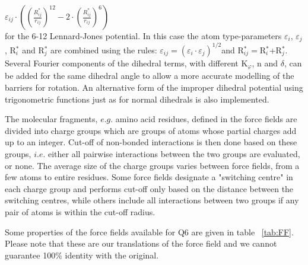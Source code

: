 \documentclass[a4paper,11pt]{article}
\let\origref\ref
\def\ref#1{\unskip~\origref{#1}}
\begin{document}
$\varepsilon_{ij} \cdot \left( {\left( {\frac{R_{ij}^\ast
}{r_{ij}}} \right)^{12}-2\cdot \left( {\frac{R_{ij}^\ast
}{r_{ij}}} \right)^6} \right)$\\

for the 6-12 Lennard-Jones potential. In this case the atom
type-parameters $\varepsilon _{i}$, $\varepsilon _{j}$,
R$^{\ast}_{i}$ and R$^{\ast }_{j}$ are combined using the rules:
$\varepsilon _{ij}=(\varepsilon _{i}\cdot \varepsilon
_{j})^{1/2}$and R$^{\ast}_{ij} = $R$^{\ast}_{i}$+R$^{\ast}_{j}$.
Several Fourier components of the dihedral terms, with different
K$_{\varphi }$, n and $\delta $, can be added for the same
dihedral angle to allow a more accurate modelling of the barriers
for rotation. An alternative form of the improper dihedral
potential using trigonometric functions just as for normal
dihedrals is also implemented.

The molecular  fragments, $e.g.$ amino  acid residues, defined  in the
force fields are divided into charge  groups which are groups of atoms
whose  partial charges  add up  to an  integer. Cut-off  of non-bonded
interactions is  then done  based on these  groups, $i.e.$  either all
pairwise  interactions  between  the  two  groups  are  evaluated,  or
none.  The average  size of  the  charge groups  varies between  force
fields,  from  a few  atoms  to  entire  residues. Some  force  fields
designate  a "switching  centre"  in each  charge  group and  performs
cut-off  only based  on the  distance between  the switching  centres,
while others include  all interactions between two groups  if any pair
of atoms is within the cut-off radius.

Some properties of the force fields available for Q6 are given in table
\ref{tab:FF}. Please note that these are our translations of the force
field and we cannot guarantee 100\% identity with the original.
\end{document}
